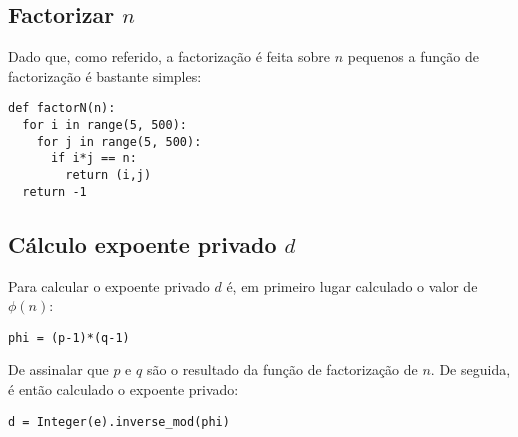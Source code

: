\subsection{Factorizar $n$}
Dado que, como referido, a factorização é feita sobre $n$ pequenos a função de factorização é bastante simples:
\begin{lstlisting}[style=sage]
def factorN(n):
  for i in range(5, 500):
    for j in range(5, 500):
      if i*j == n:
        return (i,j)
  return -1
\end{lstlisting}
\subsection{Cálculo expoente privado $d$}
Para calcular o expoente privado $d$ é, em primeiro lugar calculado o valor de $\phi(n)$:
\begin{lstlisting}[style=sage]
 phi = (p-1)*(q-1)
\end{lstlisting}
De assinalar que $p$ e $q$ são o resultado da função de factorização de $n$. De seguida, é então calculado o expoente privado:
\begin{lstlisting}[style=sage]
 d = Integer(e).inverse_mod(phi)
\end{lstlisting}
